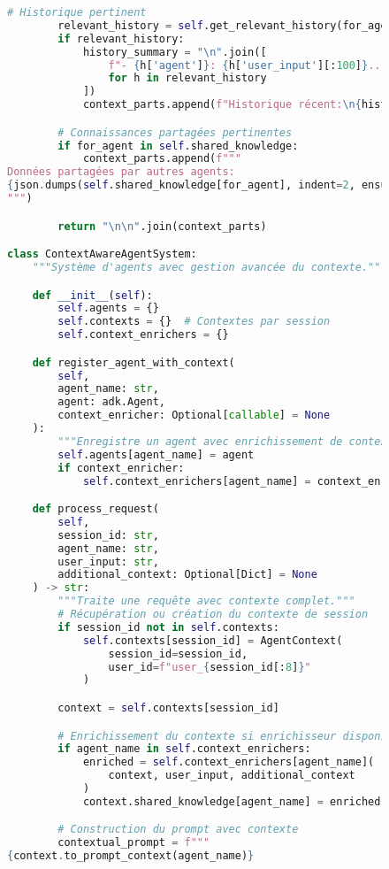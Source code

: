 \begin{figure}[h]
\begin{lstlisting}[language=Python, caption=Système de gestion du contexte inter-agents]
        # Historique pertinent
        relevant_history = self.get_relevant_history(for_agent)
        if relevant_history:
            history_summary = "\n".join([
                f"- {h['agent']}: {h['user_input'][:100]}..."
                for h in relevant_history
            ])
            context_parts.append(f"Historique récent:\n{history_summary}")

        # Connaissances partagées pertinentes
        if for_agent in self.shared_knowledge:
            context_parts.append(f"""
Données partagées par autres agents:
{json.dumps(self.shared_knowledge[for_agent], indent=2, ensure_ascii=False)}
""")

        return "\n\n".join(context_parts)

class ContextAwareAgentSystem:
    """Système d'agents avec gestion avancée du contexte."""

    def __init__(self):
        self.agents = {}
        self.contexts = {}  # Contextes par session
        self.context_enrichers = {}

    def register_agent_with_context(
        self,
        agent_name: str,
        agent: adk.Agent,
        context_enricher: Optional[callable] = None
    ):
        """Enregistre un agent avec enrichissement de contexte optionnel."""
        self.agents[agent_name] = agent
        if context_enricher:
            self.context_enrichers[agent_name] = context_enricher

    def process_request(
        self,
        session_id: str,
        agent_name: str,
        user_input: str,
        additional_context: Optional[Dict] = None
    ) -> str:
        """Traite une requête avec contexte complet."""
        # Récupération ou création du contexte de session
        if session_id not in self.contexts:
            self.contexts[session_id] = AgentContext(
                session_id=session_id,
                user_id=f"user_{session_id[:8]}"
            )

        context = self.contexts[session_id]

        # Enrichissement du contexte si enrichisseur disponible
        if agent_name in self.context_enrichers:
            enriched = self.context_enrichers[agent_name](
                context, user_input, additional_context
            )
            context.shared_knowledge[agent_name] = enriched

        # Construction du prompt avec contexte
        contextual_prompt = f"""
{context.to_prompt_context(agent_name)}


\end{lstlisting}
\end{figure}
